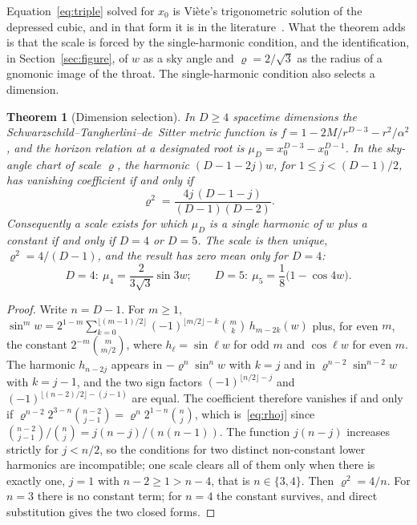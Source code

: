 \documentclass[11pt]{article}
\theoremstyle{plain}
\newtheorem{theorem}{Theorem}
\theoremstyle{definition}
\theoremstyle{remark}
\begin{document}
Equation~\eqref{eq:triple} solved for $x_{0}$ is Vi\`ete's trigonometric solution of the depressed cubic, and in
that form it is in the literature~\cite{Visser2013}. What the theorem adds is that the scale is forced by the
single-harmonic condition, and the identification, in Section~\ref{sec:figure}, of $w$ as a sky angle and
$\varrho=2/\sqrt3$ as the radius of a gnomonic image of the throat. The single-harmonic condition also selects
a dimension.

\begin{theorem}[Dimension selection]\label{thm:dimension}
In $D\ge4$ spacetime dimensions the Schwarzschild--Tangherlini--de~Sitter metric function is
$f=1-2M/r^{D-3}-r^{2}/\alpha^{2}$, and the horizon relation at a designated root is
$\mu_{D}=x_{0}^{D-3}-x_{0}^{D-1}$. In the sky-angle chart of scale $\varrho$, the harmonic $(D-1-2j)w$, for
$1\le j<(D-1)/2$, has vanishing coefficient if and only if
\begin{equation}\label{eq:rhoj}
\varrho^{2}=\frac{4j\,(D-1-j)}{(D-1)(D-2)} .
\end{equation}
Consequently a scale exists for which $\mu_{D}$ is a single harmonic of $w$ plus a constant if and only if $D=4$
or $D=5$. The scale is then unique, $\varrho^{2}=4/(D-1)$, and the result has zero mean only for $D=4$:
\[
D=4:\ \mu_{4}=\frac{2}{3\sqrt3}\sin3w;\qquad D=5:\ \mu_{5}=\frac18\bigl(1-\cos4w\bigr).
\]
\end{theorem}

\begin{proof}
Write $n=D-1$. For $m\ge1$,
$\sin^{m}w=2^{1-m}\sum_{k=0}^{\lfloor (m-1)/2\rfloor}(-1)^{\lfloor m/2\rfloor-k}\binom{m}{k}\,h_{m-2k}(w)$ plus, for even
$m$, the constant $2^{-m}\binom{m}{m/2}$, where $h_{\ell}=\sin\ell w$ for odd $m$ and $\cos\ell w$ for even $m$.
The harmonic $h_{n-2j}$ appears in $-\varrho^{n}\sin^{n}w$ with $k=j$ and in $\varrho^{n-2}\sin^{n-2}w$ with $k=j-1$,
and the two sign factors $(-1)^{\lfloor n/2\rfloor-j}$ and $(-1)^{\lfloor (n-2)/2\rfloor-(j-1)}$ are equal. The
coefficient therefore vanishes if and only if $\varrho^{n-2}2^{3-n}\binom{n-2}{j-1}=\varrho^{n}2^{1-n}\binom{n}{j}$,
which is~\eqref{eq:rhoj} since $\binom{n-2}{j-1}/\binom{n}{j}=j(n-j)/(n(n-1))$. The function $j(n-j)$ increases
strictly for $j<n/2$, so the conditions for two distinct non-constant lower harmonics are incompatible; one
scale clears all of them only when there is exactly one, $j=1$ with $n-2\ge1>n-4$, that is $n\in\{3,4\}$.
Then $\varrho^{2}=4/n$. For $n=3$ there is no constant term; for $n=4$ the constant survives, and direct
substitution gives the two closed forms.
\end{proof}
\end{document}

